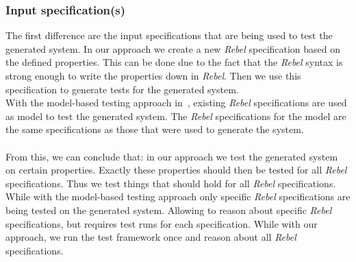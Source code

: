 \subsubsection{Input specification(s)}
The first difference are the input specifications that are being used to test the generated system. In our approach we create a new \textit{Rebel} specification based on the defined properties. This can be done due to the fact that the \textit{Rebel} syntax is strong enough to write the properties down in \textit{Rebel}. Then we use this specification to generate tests for the generated system.
\\
With the model-based testing approach in~\cite{tharumarajah2017runtime}, existing \textit{Rebel} specifications are used as model to test the generated system. The \textit{Rebel} specifications for the model are the same specifications as those that were used to generate the system.\\
\\
From this, we can conclude that: in our approach we test the generated system on certain properties. Exactly these properties should then be tested for all \textit{Rebel} specifications. Thus we test things that should hold for all \textit{Rebel} specifications. While with the model-based testing approach only specific \textit{Rebel} specifications are being tested on the generated system. Allowing to reason about specific \textit{Rebel} specifications, but requires test runs for each specification. While with our approach, we run the test framework once and reason about all \textit{Rebel} specifications.

